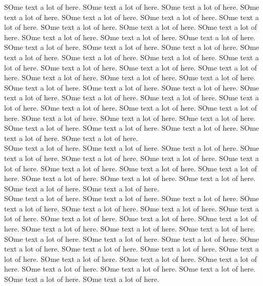 \documentclass[a4paper]{article}
\begin{document}
    SOme text a lot of here.
    SOme text a lot of here.
    SOme text a lot of here.
    SOme text a lot of here.
    SOme text a lot of here.
    SOme text a lot of here.
    SOme text a lot of here.
    SOme text a lot of here.
    SOme text a lot of here.
    SOme text a lot of here.
    SOme text a lot of here.
    SOme text a lot of here.
    SOme text a lot of here.
    SOme text a lot of here.
    SOme text a lot of here.
    SOme text a lot of here.
    SOme text a lot of here.
    SOme text a lot of here.
    SOme text a lot of here.
    SOme text a lot of here.
    SOme text a lot of here.
    SOme text a lot of here.
    SOme text a lot of here.
    SOme text a lot of here.
    SOme text a lot of here.
    SOme text a lot of here.
    SOme text a lot of here.
    SOme text a lot of here.
    SOme text a lot of here.
    SOme text a lot of here.
    SOme text a lot of here.
    SOme text a lot of here.
    SOme text a lot of here.
    SOme text a lot of here.
    SOme text a lot of here.
    SOme text a lot of here.
    SOme text a lot of here.
    SOme text a lot of here.
    SOme text a lot of here.
    SOme text a lot of here.
    SOme text a lot of here.
    SOme text a lot of here.
    SOme text a lot of here.
    SOme text a lot of here.\\
    SOme text a lot of here.
    SOme text a lot of here.
    SOme text a lot of here.
    SOme text a lot of here.
    SOme text a lot of here.
    SOme text a lot of here.
    SOme text a lot of here.
    SOme text a lot of here.
    SOme text a lot of here.
    SOme text a lot of here.
    SOme text a lot of here.
    SOme text a lot of here.
    SOme text a lot of here.
    SOme text a lot of here.
    SOme text a lot of here.\\
    SOme text a lot of here.
    SOme text a lot of here.
    SOme text a lot of here.
    SOme text a lot of here.
    SOme text a lot of here.
    SOme text a lot of here.
    SOme text a lot of here.
    SOme text a lot of here.
    SOme text a lot of here.
    SOme text a lot of here.
    SOme text a lot of here.
    SOme text a lot of here.
    SOme text a lot of here.
    SOme text a lot of here.
    SOme text a lot of here.
    SOme text a lot of here.
    SOme text a lot of here.
    SOme text a lot of here.
    SOme text a lot of here.
    SOme text a lot of here.
    SOme text a lot of here.
    SOme text a lot of here.
    SOme text a lot of here.
    SOme text a lot of here.
    SOme text a lot of here.
    SOme text a lot of here.
    SOme text a lot of here.
    SOme text a lot of here.
\end{document}
